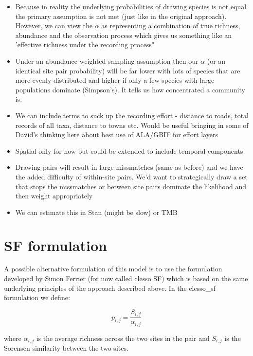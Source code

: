 \documentclass{article}
\begin{document}
\begin{itemize}
    \item Because in reality the underlying probabilities of drawing species is not equal the primary assumption is not met (just like in the original approach). However, we can view the $\alpha$ as representing a combination of true richness, abundance and the observation process which gives us something like an 'effective richness under the recording process"
    \item Under an abundance weighted sampling assumption then our $\alpha$ (or an identical site pair probability) will be far lower with lots of species that are more evenly distributed and higher if only a few species with large populations dominate (Simpson's). It tells us how concentrated a community is.
    \item We can include terms to suck up the recording effort - distance to roads, total records of all taxa, distance to towns etc. Would be useful bringing in some of David's thinking here about best use of ALA/GBIF for effort layers
    \item Spatial only for now but could be extended to include temporal components
    \item Drawing pairs will result in large missmatches (same as before) and we have the added difficulty of within-site pairs. We'd want to strategically draw a set that stops the missmatches or between site pairs dominate the likelihood and then weight appropriately
    \item We can estimate this in Stan (might be slow) or TMB
\end{itemize}

\section{SF formulation}

A possible alternative formulation of this model is to use the formulation developed by Simon Ferrier (for now called clesso SF) which is based on the same underlying principles of the approach described above. In the clesso\_sf formulation we define:

\begin{equation}
    p_{i,j} = \frac{S_{i,j}}{\alpha_{i,j}}
\end{equation}

where $\alpha_{i,j}$ is the average richness across the two sites in the pair and $S_{i,j}$ is the Sorensen similarity between the two sites. 
\end{document}

